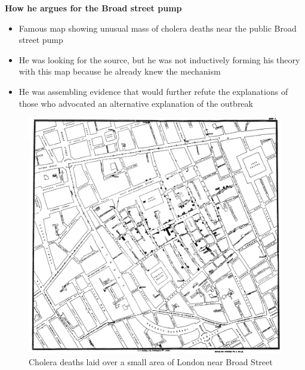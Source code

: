 \documentclass[notes=show]{beamer}
\begin{document}
\begin{frame}[plain]
\begin{center}
\textbf{How he argues for the Broad street pump}
\end{center}

\begin{itemize}
\item Famous map showing unusual mass of cholera deaths near the public Broad street pump
\item He was looking for the source, but he was not inductively forming his theory with this map because he already knew the mechanism
\item He was assembling evidence that would further refute the explanations of those who advocated an alternative explanation of the outbreak
\end{itemize}

\end{frame}

\begin{frame}[plain]

\begin{figure}
\includegraphics[scale=0.08]{./lecture_includes/Snow-cholera-map-1.jpeg}
\caption{Cholera deaths laid over a small area of London near Broad Street}
\end{figure}

\end{frame}
\end{document}
